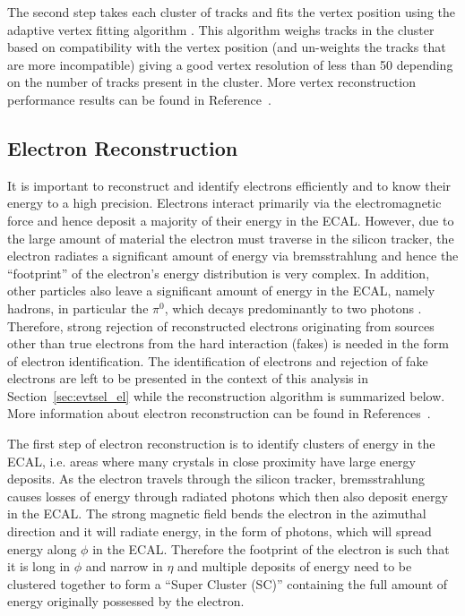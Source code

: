 The second step takes each cluster of tracks and fits the vertex position using
the adaptive vertex fitting algorithm \cite{vertexing,vtxfit}.  This algorithm
weighs tracks in the cluster based on compatibility with the vertex position
(and un-weights the tracks that are more incompatible) giving a good vertex
resolution of less than 50 \um depending on the number of tracks present in the
cluster.  More vertex reconstruction performance results can be found in
Reference~\cite{vtxtkres}.

\subsection{Electron Reconstruction}
\label {sec:cms_electron}

It is important to reconstruct and identify electrons efficiently and to
know their energy to a high precision. Electrons interact primarily via
the electromagnetic force and hence deposit a majority of their energy
in the ECAL. However, due to the large amount of material the electron
must traverse in the silicon tracker, the electron radiates a significant
amount of energy via bremsstrahlung and hence the ``footprint'' of the
electron's energy distribution is very complex. In addition, other particles
also leave a significant amount of energy in the ECAL, namely hadrons,
in particular the $\pi^0$, which decays predominantly to two photons .
Therefore, strong rejection of reconstructed electrons originating from
sources other than true electrons from the hard interaction (fakes) is needed
in the form of electron identification. The identification of electrons and
rejection of fake electrons are left to be presented in the context of this
analysis in Section~\ref{sec:evtsel_el} while the reconstruction algorithm is
summarized below. More information about electron reconstruction can be found
in References~\cite{baffiReco,egmReco,egm2013}.

The first step of electron reconstruction is to identify clusters of energy in
the ECAL, i.e. areas where many crystals in close proximity have large energy
deposits. As the electron travels through the silicon tracker, bremsstrahlung
causes losses of energy through radiated photons which then also deposit
energy in the ECAL. The strong magnetic field bends the electron in the
azimuthal direction and it will radiate energy, in the form of photons, which
will spread energy along $\phi$ in the ECAL. Therefore the footprint
of the electron is such that it is long in $\phi$ and narrow in $\eta$ and
multiple deposits of energy need to be clustered together to form a ``Super
Cluster (SC)'' containing the full amount of energy originally possessed by the
electron.

